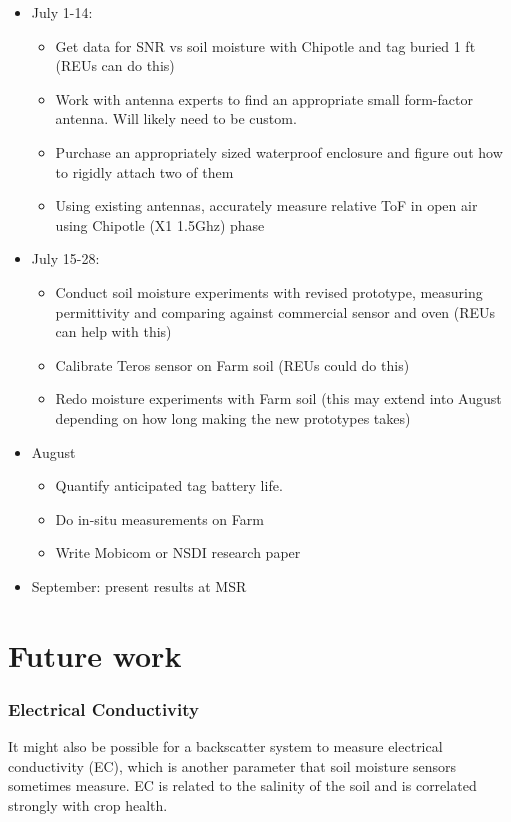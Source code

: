 \documentclass[12pt]{article}
\begin{document}
\begin{itemize}
\item July 1-14:
  \begin{itemize}
  \item Get data for SNR vs soil moisture with Chipotle and tag buried 1
    ft (REUs can do this)
  \item Work with antenna experts to find an appropriate small
    form-factor antenna. Will likely need to be custom.
  \item Purchase an appropriately sized waterproof enclosure and
    figure out how to rigidly attach two of them
  \item Using existing antennas, accurately measure relative ToF in
    open air using Chipotle (X1 1.5Ghz) phase
  \end{itemize}
  
\item July 15-28:
  \begin{itemize}
  \item Conduct soil moisture experiments with revised prototype,
    measuring permittivity and comparing against commercial sensor and
    oven (REUs can help with this)
  \item Calibrate Teros sensor on Farm soil (REUs could do this)
  \item Redo moisture experiments with Farm soil (this may extend into
    August depending on how long making the new prototypes takes)
\end{itemize}

\item August
\begin{itemize}
\item Quantify anticipated tag battery life.
\item Do in-situ measurements on Farm
\item Write Mobicom or NSDI research paper
\end{itemize}
\item September: present results at MSR
\end{itemize}

\section*{Future work}
\subsubsection*{Electrical Conductivity} It might also be possible for a
backscatter system to measure electrical conductivity (EC), which is
another parameter that soil moisture sensors sometimes measure. EC is
related to the salinity of the soil and is correlated strongly with
crop health.
\end{document}
